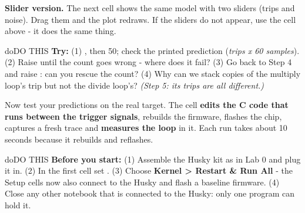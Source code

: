 \documentclass[11pt,letterpaper]{article}
\begin{document}
\vspace{4pt}

\textbf{Slider version.} The next cell shows the same model with two sliders (trips and noise). Drag them and the plot
redraws. If the sliders do not appear, use the cell above - it does the same thing.


\begin{guidecallout}{do}{DO THIS}
\textbf{Try:} (1) , then 50; check the printed prediction (\emph{trips x 60 samples}). (2) Raise
 until the count goes wrong - where does it fail? (3) Go back to Step 4 and raise :
can you rescue the count? (4) Why can we stack copies of the multiply loop's trip but not the divide loop's?
\emph{(Step 5: its trips are all different.)}
\end{guidecallout}

\clearpage


Now test your predictions on the real target. The cell \textbf{edits the C code that runs between the trigger
signals}, rebuilds the firmware, flashes the chip, captures a fresh trace and \textbf{measures the loop} in it. Each
run takes about 10 seconds because it rebuilds and reflashes.

\begin{guidecallout}{do}{DO THIS}
\textbf{Before you start:} (1) Assemble the Husky kit as in Lab 0 and plug it in. (2) In the first cell set
. (3) Choose \textbf{Kernel \textgreater{} Restart \& Run All} - the Setup cells now also
connect to the Husky and flash a baseline firmware. (4) Close any other notebook that is connected to the Husky: only
one program can hold it.
\end{guidecallout}

\end{document}
